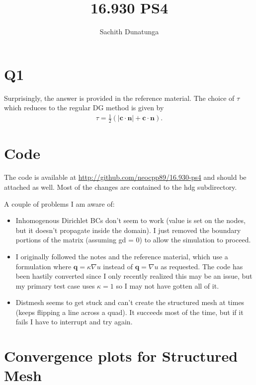 \documentclass{article}
\begin{document}
\author{Sachith Dunatunga}
\title{16.930 PS4}
\maketitle

\section{Q1}
Surprisingly, the answer is provided in the reference material\cite{nguyen}.
The choice of $\tau$ which reduces to the regular DG method is given by
\begin{align}
\tau = \frac{1}{2} \left( | \mathbf{c} \cdot \mathbf{n} | + \mathbf{c} \cdot \mathbf{n} \right).
\end{align}

\section{Code}
The code is available at \url{http://github.com/neocpp89/16.930-ps4} and should be attached as well.
Most of the changes are contained to the hdg subdirectory.

A couple of problems I am aware of:
\begin{itemize}
\item Inhomogenous Dirichlet BCs don't seem to work (value is set on the nodes, but it doesn't propagate inside the domain).
I just removed the boundary portions of the matrix (assuming gd = 0) to allow the simulation to proceed.
\item I originally followed the notes and the reference material\cite{nguyen}, which use a formulation where $\mathbf{q} = \kappa \nabla u$ instead of $\mathbf{q} = \nabla u$ as requested. The code has been hastily converted since I only recently realized this may be an issue, but my primary test case uses $\kappa = 1$ so I may not have gotten all of it.
\item Distmesh seems to get stuck and can't create the structured mesh at times (keeps flipping a line across a quad).
It succeeds most of the time, but if it fails I have to interrupt and try again.
\end{itemize}

\section{Convergence plots for Structured Mesh}
\end{document}

